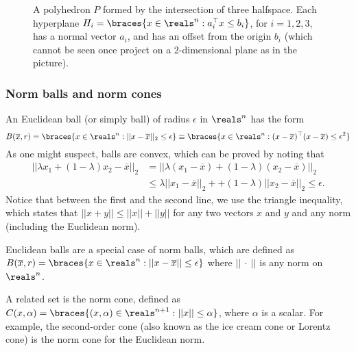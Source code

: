	\begin{figure}[H]
    \caption{A polyhedron $P$ formed by the intersection of three halfspace. Each hyperplane $H_i = \braces{x \in \reals^n : a_i^\top x \leq b_i}$, for $i = 1,2,3$, has a normal vector $a_i$, and has an offset from the origin $b_i$ (which cannot be seen once project on a 2-dimensional plane as in the picture).} \label{fig:polyhedral_set}
\end{figure}

\subsubsection{Norm balls and norm cones}

An Euclidean ball (or simply ball) of radius $\epsilon$ in $\reals^n$ has the form
%
\begin{equation*}
	B(\overline{x}, r) = \braces{x \in \reals^n : || x - \overline{x}||_2 \le \epsilon} \equiv \braces{x \in \reals^n : (x - \overline{x})^\top (x - \overline{x}) \le \epsilon^2}
\end{equation*}
%
As one might suspect, balls are convex, which can be proved by noting that
%
\begin{align*}
	||\lambda x_1 + (1 - \lambda) x_2 - \overline{x}||_2  & = ||\lambda (x_1 - \overline{x}) + (1 - \lambda) (x_2 - \overline{x})||_2 \\
	& \le \lambda ||x_1 - \overline{x}||_2 + + (1 - \lambda) ||x_2 - \overline{x}||_2 \le \epsilon.
\end{align*}
%
Notice that between the first and the second line, we use the triangle inequality, which states that $||x + y|| \le ||x|| + ||y||$ for any two vectors $x$ and $y$ and any norm (including the Euclidean norm). 

Euclidean balls are a special case of norm balls, which are defined as $B(\overline{x}, r) = \braces{x \in \reals^n : || x - \overline{x}|| \le \epsilon}$ where $||\ \cdot \ ||$ is any norm on $\reals^n$. 

A related set is the norm cone, defined as $C(x, \alpha) = \braces{(x,\alpha) \in \reals^{n+1} : ||x|| \le \alpha}$, where $\alpha$ is a scalar. For example, the second-order cone (also known as the ice cream cone or Lorentz cone) is the norm cone for the Euclidean norm.

